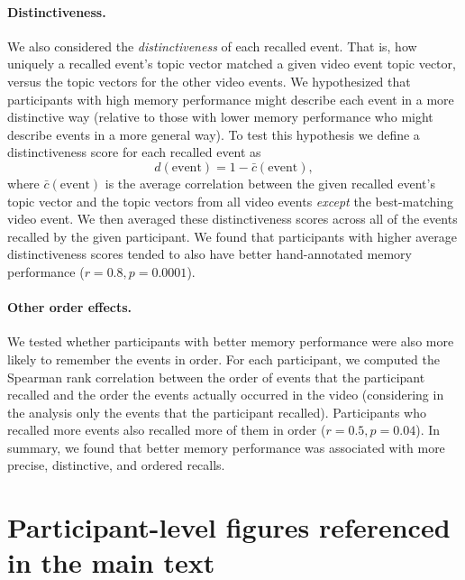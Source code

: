 \documentclass{article}
\begin{document}
\paragraph*{Distinctiveness.}
We also considered the \textit{distinctiveness} of each recalled event. That is, how uniquely a recalled event's topic vector matched a given video event topic vector, versus the topic vectors for the other video events. We hypothesized that participants with high memory performance might describe each event in a more distinctive way (relative to those with lower memory performance who might describe events in a more general way).  To test this hypothesis we define a distinctiveness score for each recalled event as
\[
  d(\mathrm{event}) = 1 - \bar{c}(\mathrm{event}),
\]
where $\bar{c}(\mathrm{event})$ is the average correlation between the given recalled event's topic vector and the topic vectors from all video events \textit{except} the best-matching video event.  We then averaged these distinctiveness scores across all of the events recalled by the given participant.  We found that participants with higher average distinctiveness scores tended to also have better hand-annotated memory performance ($r = 0.8, p = 0.0001$).

\paragraph*{Other order effects.}
We tested whether participants with better memory performance were also more likely to remember the events in order.  For each participant, we computed the Spearman rank correlation between the order of events that the participant recalled and the order the events actually occurred in the video (considering in the analysis only the events that the participant recalled).  Participants who recalled more events also recalled more of them in order ($r = 0.5, p = 0.04$). In summary, we found that better memory performance was associated with more precise, distinctive, and ordered recalls.




\section*{Participant-level figures referenced in the main text}

\end{document}
